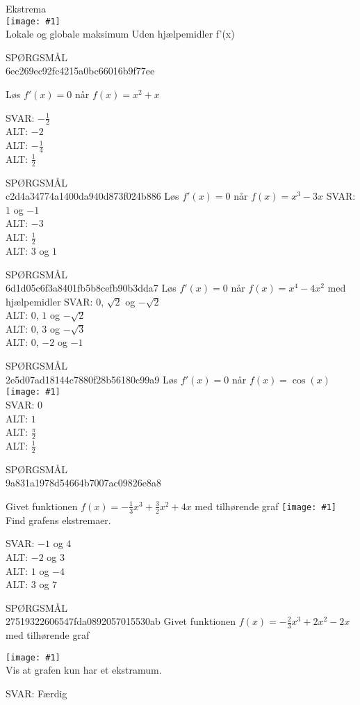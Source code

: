 \documentclass[]{article}
\newcounter{spgcounter}
\newenvironment{question}[2]{\addtocounter{spgcounter}{1} SPØRGSMÅL \thespgcounter\\}{\hspace{50px}}
\newcommand{\name}[1]{{\huge #1}\\}
\newcommand{\tag}[1]{#1}
\newcommand{\cover}[1]{\texttt{[image: \#1]}\\}
\newcommand{\image}[1]{\texttt{[image: \#1]}\\}
\newcommand{\answer}[1]{{\color{green} SVAR: #1}\\}
\newcommand{\alt}[1]{{\color{red} ALT: #1}\\}
\begin{document}
\name{Ekstrema}
\cover{ekstramer.png}
\tag{Lokale og globale maksimum}
\tag{Uden hjælpemidler}
\tag{f'(x)}

\begin{question}{multi}\id{6ec269ec92fc4215a0bc66016b9f77ee}
    
Løs $f'(x)=0$ når $f(x)=x^2+x$

\answer{$-\frac{1}{2}$}
\alt{$-2$}
\alt{$-\frac{1}{4}$}
\alt{$\frac{1}{2}$}

\end{question}
    
    \begin{question}{multi}\id{c2d4a34774a1400da940d873f024b886}
    Løs $f'(x)=0$ når $f(x)=x^3 - 3x$
    \answer{$1$ og $-1$}
    \alt{$-3$}
    \alt{$\frac{1}{2}$}
    \alt{$3$ og $1$}
    \end{question}
    
    \begin{question}{multi}\id{6d1d05c6f3a8401fb5b8cefb90b3dda7}
    Løs $f'(x)=0$ når $f(x)=x^4 - 4x^2$ med hjælpemidler
    \answer{$0$, $\sqrt{2}$ og $-\sqrt{2}$}
    \alt{$0$, $1$ og $-\sqrt{2}$}
    \alt{$0$, $3$ og $-\sqrt{3}$}
    \alt{$0$, $-2$ og $-1$}
    \end{question}
                
    \begin{question}{multi}\id{2e5d07ad18144c7880f28b56180c99a9}
    Løs $f'(x)=0$ når $f(x)=\cos(x)$
    \image{cos.png}
    \answer{$0$}
    \alt{$1$}
    \alt{$\frac{\pi}{2}$}
    \alt{$\frac{1}{2}$}
    \end{question}

    \begin{question}{multi}\id{9a831a1978d54664b7007ac09826e8a8}
        
        Givet funktionen $f(x) = -\frac{1}{3} x^3 + \frac{3}{2} x^2+ 4 x$ med tilhørende graf
        \image{g1.png}

        Find grafens ekstremaer.
        
        \answer{$-1$ og $4$}
        \alt{$-2$ og $3$}
        \alt{$1$ og $-4$}
        \alt{$3$ og $7$}

    \end{question}

    \begin{question}{multi}\id{27519322606547fda0892057015530ab}
        Givet funktionen $f(x) = -\frac{2}{3} x^3 + 2 x^2 - 2 x$ med tilhørende graf
        
        \image{g2.png}

        Vis at grafen kun har et ekstramum.
        
        \answer{Færdig}

    \end{question}
\end{document}
